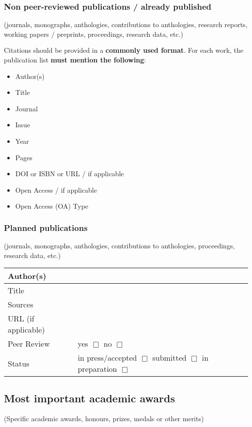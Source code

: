 \documentclass[a4paper, 11pt]{article}
\begin{document}
\subsubsection{Non peer-reviewed publications / already published}
(journals, monographs, anthologies, contributions to anthologies, research
reports, working papers / preprints, proceedings, research data, etc.)

Citations should be provided in a \textbf{commonly used format}. For each work, the
publication list \textbf{must mention the following}:

\begin{itemize}
\item Author(s)
\item Title
\item Journal
\item Issue
\item Year
\item Pages
\item DOI or ISBN or URL / if applicable
\item Open Access / if applicable
\item Open Access (OA) Type
\end{itemize}

\subsubsection{Planned publications}

(journals, monographs, anthologies, contributions to anthologies, proceedings,
research data, etc.)

\begin{tabular}{|l|l|}
\hline
Author(s) & \\
\hline
Title & \\
\hline
Sources & \\
\hline
URL (if applicable) & \\
\hline
Peer Review & yes $\Box$ \hspace{3cm} no $\Box$ \\
\hline
Status & in press/accepted $\Box$ \hspace{1cm} submitted $\Box$ \hspace{1cm} in preparation $\Box$ \\
\hline
\end{tabular}

\subsection{Most important academic awards}
(Specific academic awards, honours, prizes, medals or other merits)
\end{document}
